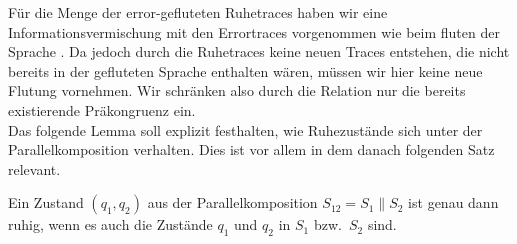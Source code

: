 Für die Menge der error-gefluteten Ruhetraces \QT{} haben wir eine Informationsvermischung
mit den Errortraces vorgenommen wie beim fluten der Sprache \EL{}. Da jedoch
durch die Ruhetraces keine neuen Traces entstehen, die nicht bereits in der
gefluteten Sprache \EL{} enthalten wären, müssen wir hier keine neue Flutung
vornehmen. Wir schränken also durch die Relation \QRel{} nur die
bereits existierende Präkongruenz \ERel{} ein.\\
Das folgende Lemma soll explizit festhalten, wie Ruhezustände sich unter der
Parallelkomposition verhalten. Dies ist vor allem in dem danach folgenden Satz
relevant.

\begin{lem}
  Ein Zustand $(q_1,q_2)$ aus der Parallelkomposition $S_{12}=S_1\|S_2$ ist
  genau dann ruhig, wenn es auch die Zustände $q_1$ und $q_2$ in $S_1$ bzw.\
  $S_2$ sind.
\end{lem}

